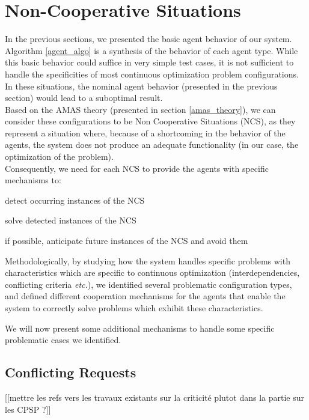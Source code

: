 \section{Non-Cooperative Situations}\label{NCS_pres}

In the previous sections, we presented the basic agent behavior of our system. Algorithm \ref{agent_algo} is a synthesis of the behavior of each agent type. While this basic behavior could suffice in very simple test cases, it is not sufficient to handle the specificities of most continuous optimization problem configurations. In these situations, the nominal agent behavior (presented in the previous section) would lead to a suboptimal result.\\
Based on the AMAS theory (presented in section \ref{amas_theory}), we can consider these configurations to be Non Cooperative Situations (NCS), as they represent a situation where, because of a shortcoming in the behavior of the agents, the system does not produce an adequate functionality (in our case, the optimization of the problem).\\
Consequently, we need for each NCS to provide the agents with specific mechanisms to:
\begin{compactenum}
\item detect occurring instances of the NCS
\item solve detected instances of the NCS
\item if possible, anticipate future instances of the NCS and avoid them
\end{compactenum}

Methodologically, by studying how the system handles specific problems with characteristics which are specific to continuous optimization (interdependencies, conflicting criteria \emph{etc.}), we identified several problematic configuration types, and defined different cooperation mechanisms for the agents that enable the system to correctly solve problems which exhibit these characteristics.

We will now present some additional mechanisms to handle some specific problematic cases we identified.

\subsection{Conflicting Requests}

[[mettre les refs vers les travaux existants sur la criticité plutot dans la partie sur les CPSP ?]]

